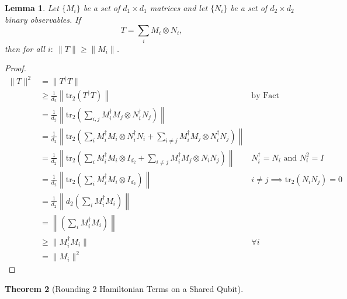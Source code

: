 \documentclass[12pt]{article}
\theoremstyle{plain}
\newtheorem{theorem}{Theorem}[section]
\newtheorem{lemma}[theorem]{Lemma}
\begin{document}
\begin{lemma}
    Let $\{M_i\}$ be a set of $d_1 \times d_1$ matrices and let $\{N_i\}$ be a set of $d_2 \times d_2$ binary observables. If
    \begin{equation}
        T = \sum\limits_{i} M_i \otimes N_i,
    \end{equation}
    then for all $i:\ \|T\| \geq \|M_i\|$.
\end{lemma}
\begin{proof}
    \begin{align*}
        \|T\|^2 &= \|T^\dagger T\|\\
        &\geq \frac{1}{d_2} \left\|\text{tr}_2\left(T^\dagger T\right)\right\| &\text{by Fact}\\
        &= \frac{1}{d_2} \left\|\text{tr}_2\left(\sum\limits_{i,j} M_i^\dagger M_j \otimes N_i^\dagger N_j\right)\right\|\\
        &= \frac{1}{d_2} \left\|\text{tr}_2\left(\sum\limits_{i} M_i^\dagger M_i \otimes N_i^\dagger N_i + \sum\limits_{i \neq j} M_i^\dagger M_j \otimes N_i^\dagger N_j\right)\right\|\\
        &= \frac{1}{d_2} \left\|\text{tr}_2\left(\sum\limits_{i} M_i^\dagger M_i \otimes I_{d_2} + \sum\limits_{i \neq j} M_i^\dagger M_j \otimes N_i N_j\right)\right\| & N_i^\dagger = N_i \text{ and } N_i^2 = I\\
        &= \frac{1}{d_2} \left\|\text{tr}_2\left(\sum\limits_{i} M_i^\dagger M_i \otimes I_{d_2}\right)\right\| & i \neq j \implies \text{tr}_2 \left(N_i N_j\right) = 0 \\
        &= \frac{1}{d_2} \left\|d_2 \left(\sum\limits_{i} M_i^\dagger M_i\right)\right\| \\
        &= \left\| \left(\sum\limits_{i} M_i^\dagger M_i\right)\right\|\\
        &\geq \|M_i^\dagger M_i\| &\forall i\\
        &= \|M_i\|^2
    \end{align*}
\end{proof}

\begin{theorem}[Rounding 2 Hamiltonian Terms on a Shared Qubit]
    
\end{theorem}

\newpage
\end{document}
